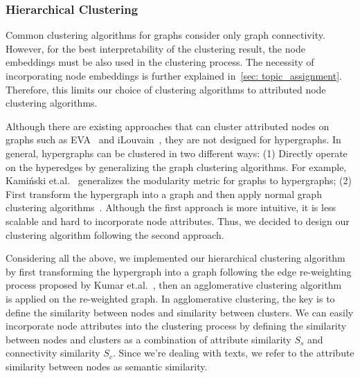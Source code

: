 \subsubsection{Hierarchical Clustering}\label{sec: clustering}
Common clustering algorithms for graphs consider only graph connectivity.
However, for the best interpretability of the clustering result, the node embeddings must be also used in the clustering process.
The necessity of incorporating node embeddings is further explained in~\autoref{sec: topic_assignment}.
Therefore, this limits our choice of clustering algorithms to attributed node clustering algorithms.

Although there are existing approaches that can cluster attributed nodes on graphs such as EVA~\cite{citraro2020eva} and iLouvain~\cite{combe2015louvain}, they are not designed for hypergraphs.
In general, hypergraphs can be clustered in two different ways: 
(1) Directly operate on the hyperedges by generalizing the graph clustering algorithms.
For example, Kamiński et.al.~\cite{kaminski2021hgraphcommunity} generalizes the modularity metric for graphs to hypergraphs; 
(2) First transform the hypergraph into a graph and then apply normal graph clustering algorithms~\cite{kumar2020new}.
Although the first approach is more intuitive, it is less scalable and hard to incorporate node attributes.
Thus, we decided to design our clustering algorithm following the second approach.

Considering all the above, we implemented our hierarchical clustering algorithm by first transforming the hypergraph into a graph following the edge re-weighting process proposed by Kumar et.al.~\cite{kumar2020new},
then an agglomerative clustering algorithm~\cite{steinbach2000doccluster} is applied on the re-weighted graph.
In agglomerative clustering, the key is to define the similarity between nodes and similarity between clusters.
We can easily incorporate node attributes into the clustering process by defining the similarity between nodes and clusters as a combination of attribute similarity $S_s$ and connectivity similarity $S_c$.
Since we're dealing with texts, we refer to the attribute similarity between nodes as semantic similarity. 

